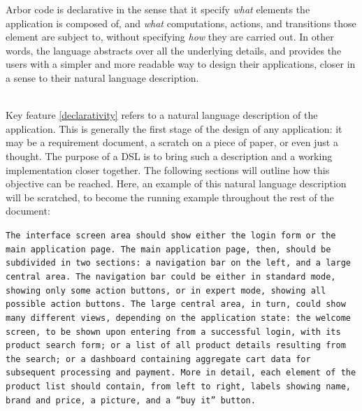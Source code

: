 \documentclass[12pt]{article} %
\newcommand{\DSL}{DSL}
\newcommand{\A}{Arbor}
\newcommand{\myverb}[1]{\texttt{\footnotesize #1}}
\newcommand{\q}[1]{``#1''}
\newcounter{kfcounter}
\newenvironment{kfe}[2]
	{\refstepcounter{kfcounter}\begin{tcolorbox}[enhanced,colframe=blue!50!black,colback=blue!10!white,title=Key Feature \thekfcounter: \emph{#1}\label{#2},lifted shadow={1mm}{-2mm}{3mm}{0.1mm}{black!50!white},fonttitle=\bfseries]}
	{\end{tcolorbox}}
\begin{document}
\begin{kfe}{Declarativity}{declarativity}
\A{} code is declarative in the sense that it specify \emph{what} elements the application is composed of, and \emph{what} computations, actions, and transitions those element are subject to, without specifying \emph{how} they are carried out. In other words, the language abstracts over all the underlying details, and provides the users with a simpler and more readable way to design their applications, closer in a sense to their natural language description.
\end{kfe}
~\\
Key feature \ref{declarativity} refers to a natural language description of the application. This is generally the first stage of the design of any application: it may be a requirement document, a scratch on a piece of paper, or even just a thought. The purpose of a \DSL{} is to bring such a description and a working implementation closer together. 
The following sections will outline how this objective can be reached. Here, an example of this natural language description will be scratched, to become the running example throughout the rest of the document:\\
\begin{tcolorbox}[colback=yellow!5,fonttitle=\bfseries,colframe=yellow!50!black,title=Description of a webshop application in natural language,lifted shadow={1mm}{-2mm}{3mm}{0.1mm}{black!50!white}]
\myverb{\scriptsize The interface screen area should show either the login form or the main application page.\newline
The main application page, then, should be subdivided in two sections: a navigation bar on the left, and a large central area.\newline
The navigation bar could be either in standard mode, showing only some action buttons, or in expert mode, showing all possible action buttons.\newline
The large central area, in turn, could show many different views, depending on the application state: the welcome screen, to be shown upon entering from a successful login, with its product search form; or a list of all product details resulting from the search; or a dashboard containing aggregate cart data for subsequent processing and payment.\newline
More in detail, each element of the product list should contain, from left to right, labels showing name, brand and price, a picture, and a \q{buy it} button.}
\end{tcolorbox}
\end{document}
